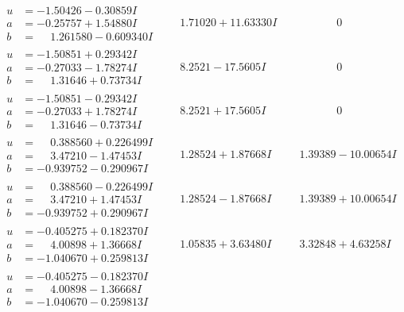 \documentclass[1p]{elsarticle_modified}
\theoremstyle{definition}
\begin{document}
$$\begin{array}{c|c|c}
\begin{aligned}
u &= -1.50426 - 0.30859 I \\
a &= -0.25757 + 1.54880 I \\
b &= \phantom{-}1.261580 - 0.609340 I\end{aligned}
 & \phantom{-}1.71020 + 11.63330 I & \phantom{-0.000000 } 0 \\ \hline\begin{aligned}
u &= -1.50851 + 0.29342 I \\
a &= -0.27033 - 1.78274 I \\
b &= \phantom{-}1.31646 + 0.73734 I\end{aligned}
 & \phantom{-}8.2521 - 17.5605 I & \phantom{-0.000000 } 0 \\ \hline\begin{aligned}
u &= -1.50851 - 0.29342 I \\
a &= -0.27033 + 1.78274 I \\
b &= \phantom{-}1.31646 - 0.73734 I\end{aligned}
 & \phantom{-}8.2521 + 17.5605 I & \phantom{-0.000000 } 0 \\ \hline\begin{aligned}
u &= \phantom{-}0.388560 + 0.226499 I \\
a &= \phantom{-}3.47210 - 1.47453 I \\
b &= -0.939752 - 0.290967 I\end{aligned}
 & \phantom{-}1.28524 + 1.87668 I & \phantom{-}1.39389 - 10.00654 I \\ \hline\begin{aligned}
u &= \phantom{-}0.388560 - 0.226499 I \\
a &= \phantom{-}3.47210 + 1.47453 I \\
b &= -0.939752 + 0.290967 I\end{aligned}
 & \phantom{-}1.28524 - 1.87668 I & \phantom{-}1.39389 + 10.00654 I \\ \hline\begin{aligned}
u &= -0.405275 + 0.182370 I \\
a &= \phantom{-}4.00898 + 1.36668 I \\
b &= -1.040670 + 0.259813 I\end{aligned}
 & \phantom{-}1.05835 + 3.63480 I & \phantom{-}3.32848 + 4.63258 I \\ \hline\begin{aligned}
u &= -0.405275 - 0.182370 I \\
a &= \phantom{-}4.00898 - 1.36668 I \\
b &= -1.040670 - 0.259813 I\end{aligned}

\end{array}$$
\end{document}
